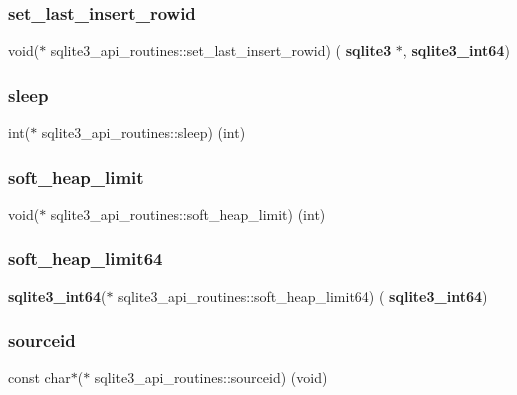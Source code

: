 \subsubsection{set\_last\_insert\_rowid}
{\footnotesize\ttfamily void($\ast$ sqlite3\+\_\+api\+\_\+routines\+::set\+\_\+last\+\_\+insert\+\_\+rowid) (\textbf{ sqlite3} $\ast$, \textbf{ sqlite3\+\_\+int64})}

\mbox{\label{structsqlite3__api__routines_a87cb2a664bb94f1a96fd4c3bf02a5e25}} 
\subsubsection{sleep}
{\footnotesize\ttfamily int($\ast$ sqlite3\+\_\+api\+\_\+routines\+::sleep) (int)}

\mbox{\label{structsqlite3__api__routines_a720a37e18110008f32c32b43e6df7bd6}} 
\subsubsection{soft\_heap\_limit}
{\footnotesize\ttfamily void($\ast$ sqlite3\+\_\+api\+\_\+routines\+::soft\+\_\+heap\+\_\+limit) (int)}

\mbox{\label{structsqlite3__api__routines_ab3c891f0430b0a79449e16553fe2f7eb}} 
\subsubsection{soft\_heap\_limit64}
{\footnotesize\ttfamily \textbf{ sqlite3\+\_\+int64}($\ast$ sqlite3\+\_\+api\+\_\+routines\+::soft\+\_\+heap\+\_\+limit64) (\textbf{ sqlite3\+\_\+int64})}

\mbox{\label{structsqlite3__api__routines_ad1314899ed69b8d423c6418b51e9c0ba}} 
\subsubsection{sourceid}
{\footnotesize\ttfamily const char$\ast$($\ast$ sqlite3\+\_\+api\+\_\+routines\+::sourceid) (void)}

